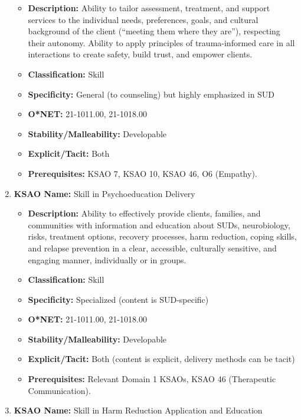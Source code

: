 \documentclass[
  letterpaper,
  DIV=11,
  numbers=noendperiod]{scrartcl}
\providecommand{\tightlist}{%
  \setlength{\itemsep}{0pt}\setlength{\parskip}{0pt}}
\begin{document}
\begin{enumerate}
  \begin{itemize}
  \tightlist
  \item
    \textbf{Description:} Ability to tailor assessment, treatment, and
    support services to the individual needs, preferences, goals, and
    cultural background of the client (``meeting them where they are''),
    respecting their autonomy. Ability to apply principles of
    trauma-informed care in all interactions to create safety, build
    trust, and empower clients.
  \item
    \textbf{Classification:} Skill
  \item
    \textbf{Specificity:} General (to counseling) but highly emphasized
    in SUD
  \item
    \textbf{O*NET:} 21-1011.00, 21-1018.00
  \item
    \textbf{Stability/Malleability:} Developable
  \item
    \textbf{Explicit/Tacit:} Both
  \item
    \textbf{Prerequisites:} KSAO 7, KSAO 10, KSAO 46, O6 (Empathy).
  \end{itemize}
\item
  \textbf{KSAO Name:} Skill in Psychoeducation Delivery

  \begin{itemize}
  \tightlist
  \item
    \textbf{Description:} Ability to effectively provide clients,
    families, and communities with information and education about SUDs,
    neurobiology, risks, treatment options, recovery processes, harm
    reduction, coping skills, and relapse prevention in a clear,
    accessible, culturally sensitive, and engaging manner, individually
    or in groups.
  \item
    \textbf{Classification:} Skill
  \item
    \textbf{Specificity:} Specialized (content is SUD-specific)
  \item
    \textbf{O*NET:} 21-1011.00, 21-1018.00
  \item
    \textbf{Stability/Malleability:} Developable
  \item
    \textbf{Explicit/Tacit:} Both (content is explicit, delivery methods
    can be tacit)
  \item
    \textbf{Prerequisites:} Relevant Domain 1 KSAOs, KSAO 46
    (Therapeutic Communication).
  \end{itemize}
\item
  \textbf{KSAO Name:} Skill in Harm Reduction Application and Education


\end{enumerate}
\end{document}
